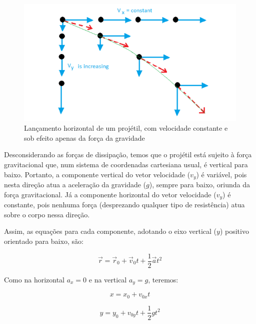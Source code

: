 \documentclass[10pt]{article}
\begin{document}
\begin{figure}
	\begin{center}
		\includegraphics[scale=0.5]{movimento_horizontal.png}
		\caption{Lançamento horizontal de um projétil, com velocidade constante e sob efeito apenas da força da gravidade}
		\label{fig:horizontal}
	\end{center}
\end{figure}

Desconsiderando as forças de dissipação, temos que o projétil está sujeito à força gravitacional que, num sistema de coordenadas cartesiana usual, é vertical para baixo. Portanto, a componente vertical do vetor velocidade ($v_y$) é variável, pois nesta direção atua a aceleração da gravidade ($g$), sempre para baixo, oriunda da força gravitacional. Já a componente horizontal do vetor velocidade ($v_y$) é constante, pois nenhuma força (desprezando qualquer tipo de resistência) atua sobre o corpo nessa direção.

Assim, as equações para cada componente, adotando o eixo vertical ($y$) positivo orientado para baixo, são:

\begin{equation}
\vec{r} = \vec{r}_0 + \vec{v}_0t + \frac{1}{2}\vec{a}t^2
\label{eq:posicao}
\end{equation}

Como na horizontal $a_x=0$ e na vertical $a_y=g$, teremos:

\begin{equation}
x = x_0 + v_{0x}t
\label{eq:posicao_horizontal}
\end{equation}

\begin{equation}
y = y_0 + v_{0y}t + \frac{1}{2}gt^2
\label{eq:posicao_vertical}
\end{equation}
\end{document}
